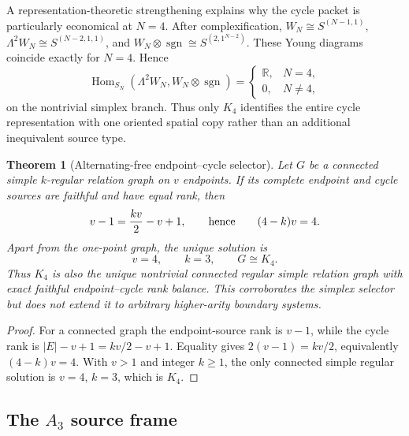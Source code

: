 \documentclass[11pt]{article}
\newtheorem{theorem}{Theorem}[section]
\theoremstyle{definition}
\theoremstyle{remark}
\newcommand{\R}{\mathbb R}
\newcommand{\Hom}{\operatorname{Hom}}
\begin{document}
A representation-theoretic strengthening explains why the cycle packet is
particularly economical at $N=4$.  After complexification,
$W_N\cong S^{(N-1,1)}$,
$\Lambda^2W_N\cong S^{(N-2,1,1)}$, and
$W_N\otimes\operatorname{sgn}\cong S^{(2,1^{N-2})}$.  These Young diagrams
coincide exactly for $N=4$.  Hence
\begin{equation}
 \Hom_{S_N}(\Lambda^2W_N,W_N\otimes\operatorname{sgn})
 =\begin{cases}\R,&N=4,\\0,&N\ne4,\end{cases}
 \label{eq:supp-oriented-copy}
\end{equation}
on the nontrivial simplex branch.  Thus only $K_4$ identifies the entire cycle
representation with one oriented spatial copy rather than an additional
inequivalent source type.

\begin{theorem}[Alternating-free endpoint--cycle selector]
\label{cor:supp-regular-graph-k4}
Let $G$ be a connected simple $k$-regular relation graph on $v$ endpoints.  If
its complete endpoint and cycle sources are faithful and have equal rank, then
\begin{equation}
 v-1=\frac{kv}{2}-v+1,
 \qquad\hbox{hence}\qquad
 (4-k)v=4.
 \label{eq:supp-regular-graph-balance}
\end{equation}
Apart from the one-point graph, the unique solution is
\begin{equation}
 \boxed{v=4,\qquad k=3,\qquad G\cong K_4.}
 \label{eq:supp-regular-graph-k4}
\end{equation}
Thus $K_4$ is also the unique nontrivial connected regular simple relation graph
with exact faithful endpoint--cycle rank balance.  This corroborates the
simplex selector but does not extend it to arbitrary higher-arity boundary
systems.
\end{theorem}

\begin{proof}
For a connected graph the endpoint-source rank is $v-1$, while the cycle rank is
$|E|-v+1=kv/2-v+1$.  Equality gives
$2(v-1)=kv/2$, equivalently $(4-k)v=4$.  With $v>1$ and integer $k\ge1$, the
only connected simple regular solution is $v=4$, $k=3$, which is $K_4$.
\end{proof}

\subsection{The \texorpdfstring{$A_3$}{A3} source frame}
\end{document}
